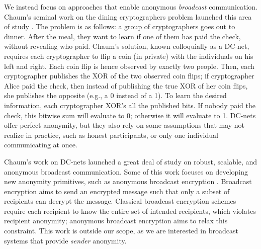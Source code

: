 \documentclass[10pt, twocolumn]{article}
\begin{document}
We instead focus on approaches that enable anonymous \emph{broadcast} communication.
Chaum's seminal work on the dining cryptographers problem launched this area of study \cite{chaum88}.
The problem is as follows: a group of cryptographers goes out to dinner. After the meal, they want to learn if one of them has paid the check, without revealing who paid.
Chaum's solution, known colloquially as a DC-net, requires each cryptographer to flip a coin (in private) with the individuals on his left and right. Each coin flip is hence observed by exactly two people.
Then, each cryptographer publishes the XOR of the two observed coin flips; if cryptographer Alice paid the check, then instead of publishing the true XOR of her coin flips, she publishes the opposite (e.g., a 0 instead of a 1).
To learn the desired information, each cryptographer XOR's all the published bits. If nobody paid the check, this bitwise sum will evaluate to 0; otherwise it will evaluate to 1.
DC-nets offer perfect anonymity, but they also rely on some assumptions that may not realize in practice, such as honest participants, or only one individual communicating at once.

Chaum's work on DC-nets launched a great deal of study on robust, scalable, and anonymous broadcast communication. 
Some of this work focuses on developing new anonymity primitives, such as anonymous broadcast encryption \cite{libert2012anonymous, fazio2012outsider}.
Broadcast encryption aims to send an encrypted message such that only a subset of recipients can decrypt the message.
Classical broadcast encryption schemes require each recipient to know the entire set of intended recipients, which violates recipient anonymity; anonymous broadcast encryption aims to relax this constraint. 
This work is outside our scope, as we are interested in broadcast systems that provide \emph{sender} anonymity.
\end{document}
